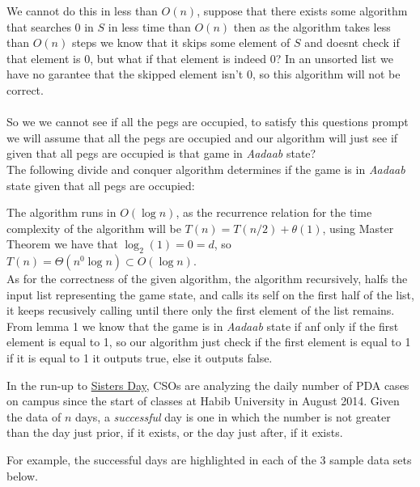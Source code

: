 \documentclass[addpoints]{exam}
\begin{document}
\begin{questions}
\begin{solution}
			We cannot do this in less than $O(n)$, suppose that there exists some algorithm that searches 0 in $S$ in less time than $O(n)$ then as the algorithm takes less than $O(n)$ steps we know that it skips some element of $S$ and doesnt check if that element is $0$, but what if that element is indeed 0? In an unsorted list we have no garantee that the skipped element isn't 0, so this algorithm will not be correct.
			\\\\So we we cannot see if all the pegs are occupied, to satisfy this questions prompt we will assume that all the pegs are occupied and our algorithm will just see if given that all pegs are occupied is that game in \textit{Aadaab} state?
			\\The following divide and conquer algorithm determines if the game is in \textit{Aadaab} state given that all pegs are occupied:

			\newpage
			
			The algorithm runs in $O(\log n)$, as the recurrence relation for the time complexity of the algorithm will be $T(n) = T(n/2) + \theta(1)$,
			using Master Theorem we have that $\log_2 (1) = 0 = d$, so $T(n) = \Theta(n^0 \log n) \subset O(\log n)$.
		\\As for the correctness of the given algorithm, the algorithm recursively, halfs the input list representing the game state, and calls its self on the first half of the list, it keeps recusively calling until there only the first element of the list remains.
		\\From lemma 1 we know that the game is in \textit{Aadaab} state if anf only if the first element is equal to 1, so our algorithm just check if the first element is equal to 1 if it is equal to 1 it outputs true, else it outputs false.

	\end{solution}

	\question[5] In the run-up to \href{https://en.dailypakistan.com.pk/13-Jan-2019/this-pakistani-varsity-will-celebrate-feb-14-as-sister-s-day}{Sisters Day}, CSOs are analyzing the daily number of PDA cases on campus since the start of classes at Habib University in August 2014. Given the data of $n$ days, a \textit{successful} day is one in which the number is not greater than the day just prior, if it exists, or the day just after, if it exists.

	For example, the successful days are highlighted in each of the 3 sample data sets below.


\end{questions}
\end{document}
